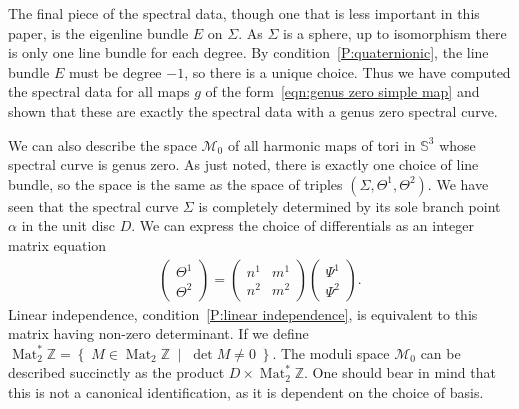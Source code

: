 \documentclass{article}
\numberwithin{equation}{section}
\numberwithin{figure}{section}
\newcommand{\Set}[2]{\left\{\; #1 \;\middle|\; #2 \;\right\}}
\DeclareMathOperator{\Mat}{Mat}
\newcommand{\Z}{\mathbb{Z}}
\begin{document}


The final piece of the spectral data, though one that is less important in this paper, is the eigenline bundle $E$ on $\Sigma$. As $\Sigma$ is a sphere, up to isomorphism there is only one line bundle for each degree. By condition~\ref{P:quaternionic}, the line bundle $E$ must be degree $-1$, so there is a unique choice. Thus we have computed the spectral data for all maps $g$ of the form~\eqref{eqn:genus zero simple map} and shown that these are exactly the spectral data with a genus zero spectral curve.


We can also describe the space $\mathcal{M}_0$ of all harmonic maps of tori in $\mathbb{S}^3$ whose spectral curve is genus zero. As just noted, there is exactly one choice of line bundle, so the space is the same as the space of triples $(\Sigma,\Theta^1,\Theta^2)$. We have seen that the spectral curve $\Sigma$ is completely determined by its sole branch point $\alpha$ in the unit disc $D$. 
We can express the choice of differentials as an integer matrix equation
\begin{align*}
\begin{pmatrix}
\Theta^1 \\ \Theta^2
\end{pmatrix}
=
\begin{pmatrix}
n^1 & m^1 \\
n^2 & m^2
\end{pmatrix}
\begin{pmatrix}
\Psi^1 \\ \Psi^2
\end{pmatrix}.
\end{align*}
Linear independence, condition~\ref{P:linear independence}, is equivalent to this matrix having non-zero determinant. If we define $\Mat_2^*\Z = \Set{ M \in \Mat_2\Z }{\det M \neq 0}$. The moduli space $\mathcal{M}_0$ can be described succinctly as the product $D \times \Mat_2^*\Z$. 
One should bear in mind that this is not a canonical identification, as it is dependent on the choice of basis.
\end{document}
